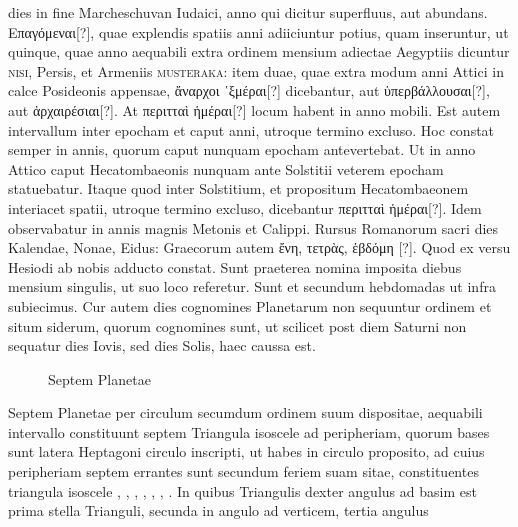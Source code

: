 dies in fine Marcheschuvan Iudaici, anno qui dicitur superfluus, aut
abundans.
\textgreek{Επαγόμεναι[?]},
 quae explendis spatiis anni adiiciuntur potius,
quam inseruntur, ut quinque, quae anno aequabili extra ordinem mensium
adiectae Aegyptiis dicuntur \textsc{nisi}, Persis, et Armeniis
 \textsc{musteraka}: 
item duae, quae extra modum anni Attici in calce Posideonis
appensae, \textgreek{ἄναρχοι ῾ξμέραι[?]} dicebantur,
 aut \textgreek{ὑπερβάλλουσαι[?]}, aut \textgreek{ἀρχαιρέσιαι[?]}.
At \textgreek{περιτταὶ ἡμέραι[?]} locum habent in anno mobili.
Est autem intervallum
inter epocham et caput anni, utroque termino excluso.
Hoc
constat semper in annis, quorum caput nunquam epocham antevertebat.
Ut in anno Attico caput Hecatombaeonis nunquam ante Solstitii
veterem epocham statuebatur.
Itaque quod inter Solstitium, et
propositum Hecatombaeonem interiacet spatii, utroque termino excluso,
dicebantur \textgreek{περιτταὶ ἡμέραι[?]}.
Idem observabatur in annis magnis
Metonis et Calippi.
Rursus Romanorum sacri dies Kalendae, Nonae,
Eidus: Graecorum autem \textgreek{ἔνη, τετρὰς, ἑβδόμη [?]}.
Quod ex versu Hesiodi ab
nobis adducto constat.
Sunt praeterea nomina imposita diebus mensium
singulis, ut suo loco referetur.
Sunt et secundum hebdomadas
ut infra subiecimus.
%
Cur autem dies cognomines Planetarum non sequuntur ordinem et
situm siderum, quorum cognomines sunt, ut scilicet post diem Saturni
non sequatur dies Iovis, sed dies Solis, haec caussa est.
\begin{figure}[tbp]
  \centering
  \def\svgwidth{0.459\textwidth}
  {\astrofont}
  \caption{Septem Planetae}
  \label{fig:p008}
\end{figure}
Septem Planetae
per circulum secumdum ordinem suum
dispositae, aequabili intervallo constituunt septem
Triangula isoscele ad peripheriam, quorum
bases sunt latera Heptagoni circulo inscripti,
ut habes in circulo proposito, ad cuius
peripheriam septem errantes sunt secundum
feriem suam sitae, constituentes triangula
isoscele , , ,
 , , , .
In quibus Triangulis dexter angulus ad basim
est prima stella Trianguli, secunda in angulo ad verticem, tertia angulus
